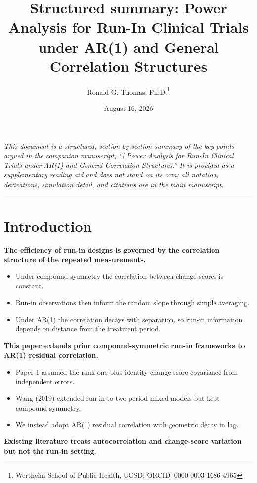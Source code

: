 \documentclass[
  11pt,
]{article}
\title{Structured summary: \textbar{} Power Analysis for Run-In Clinical Trials under AR(1) and General Correlation Structures}
\author{Ronald G. Thomas, Ph.D.\thanks{Wertheim School of Public Health, UCSD; ORCID: 0000-0003-1686-4965}}
\date{August 16, 2026}
\begin{document}
\maketitle

{
\setcounter{tocdepth}{2}
\tableofcontents
}
\emph{This document is a structured, section-by-section summary of the key points argued in the companion manuscript, ``| Power Analysis for Run-In Clinical Trials under AR(1) and General Correlation Structures.'' It is provided as a supplementary reading aid and does not stand on its own; all notation, derivations, simulation detail, and citations are in the main manuscript.}

\bigskip\noindent

\rule{\textwidth}{0.4pt}\bigskip

\section{Introduction}\label{introduction}

\textbf{The efficiency of run-in designs is governed by the correlation structure of the repeated measurements.}

\begin{itemize}\setlength{\itemsep}{2pt}\setlength{\parskip}{0pt}
\item Under compound symmetry the correlation between change scores is constant.
\item Run-in observations then inform the random slope through simple averaging.
\item Under AR(1) the correlation decays with separation, so run-in information depends on distance from the treatment period.
\end{itemize}

\textbf{This paper extends prior compound-symmetric run-in frameworks to AR(1) residual correlation.}

\begin{itemize}\setlength{\itemsep}{2pt}\setlength{\parskip}{0pt}
\item Paper 1 assumed the rank-one-plus-identity change-score covariance from independent errors.
\item Wang (2019) extended run-in to two-period mixed models but kept compound symmetry.
\item We instead adopt AR(1) residual correlation with geometric decay in lag.
\end{itemize}

\textbf{Existing literature treats autocorrelation and change-score variation but not the run-in setting.}
\end{document}
